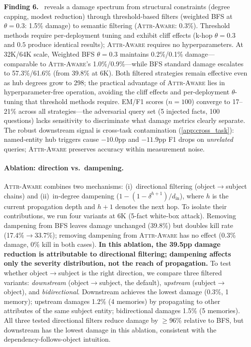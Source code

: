 \documentclass{article}
\newcommand{\attraware}{\textsc{Attr-Aware}}
\newcommand{\finding}[1]{\vspace{2pt}\noindent\textbf{Finding #1.}~}
\begin{document}
\finding{6}  reveals a damage spectrum from structural constraints (degree capping, modest reduction) through threshold-based filters (weighted BFS at $\theta{=}0.3$: 1.5\% damage) to semantic filtering (\attraware{}: 0.3\%).
Threshold methods require per-deployment tuning and exhibit cliff effects (k-hop $\theta{=}0.3$ and $0.5$ produce identical results); \attraware{} requires no hyperparameters.
At 32K/64K scale, Weighted BFS $\theta{=}0.3$ maintains 0.2\%/0.1\% damage---comparable to \attraware{}'s 1.0\%/0.9\%---while BFS standard damage escalates to 57.3\%/61.6\% (from 39.8\% at 6K).
Both filtered strategies remain effective even as hub degrees grow to 298; the practical advantage of \attraware{} lies in hyperparameter-free operation, avoiding the cliff effects and per-deployment $\theta$-tuning that threshold methods require.
EM/F1 scores ($n{=}100$) converge to 17--21\% across all strategies---the adversarial query set (5 injected facts, 100 questions) lacks sensitivity to discriminate what damage metrics clearly separate.
The robust downstream signal is cross-task contamination (\cref{app:cross_task}): named-entity hub triggers cause $-10.0$pp and $-11.9$pp F1 drops on \textit{unrelated} queries; \attraware{} preserves accuracy within measurement noise.

\paragraph{Ablation: direction vs.\ dampening.}
\attraware{} combines two mechanisms: (i)~directional filtering (object$\rightarrow$subject chains) and (ii)~in-degree dampening ($1 - (1-\delta^{h+1})/d_{\text{in}}$), where $h$ is the current propagation depth and $h{+}1$ denotes the next hop.
To isolate their contributions, we run four variants at 6K (5-fact white-box attack).
Removing dampening from BFS leaves damage unchanged (39.8\%) but doubles kill rate (17.4\%$\rightarrow$33.7\%);
removing dampening from \attraware{} has no effect (0.3\% damage, 0\% kill in both cases).
\textbf{In this ablation, the 39.5pp damage reduction is attributable to directional filtering; dampening affects only the severity distribution, not the reach of propagation.}
To test whether object$\rightarrow$subject is the right direction, we compare three filtered variants: \textit{downstream} (object$\rightarrow$subject, the default), \textit{upstream} (subject$\rightarrow$object), and \textit{bidirectional}.
Downstream achieves the lowest damage (0.3\%, 1 memory); upstream damages 1.2\% (4 memories) by propagating to other attributes of the same subject entity; bidirectional damages 1.5\% (5 memories).
All three tested directional filters reduce damage by $\geq$96\% relative to BFS, but downstream has the lowest damage in this ablation, consistent with the dependency-follows-object intuition.
\end{document}
